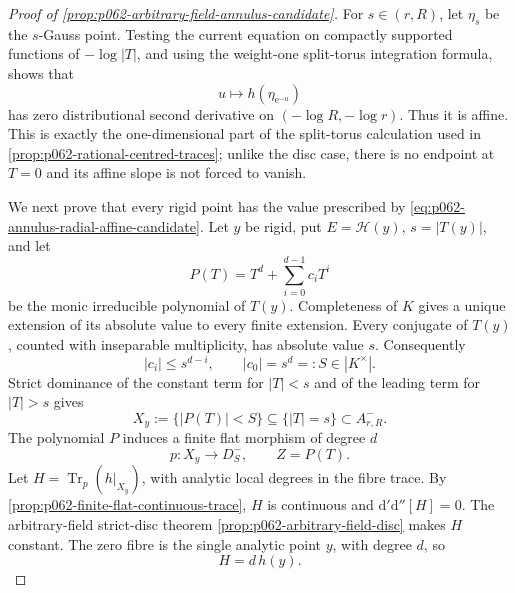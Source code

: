 \begin{proof}[Proof of \cref{prop:p062-arbitrary-field-annulus-candidate}]
For \(s\in(r,R)\), let \(\eta_s\) be the \(s\)-Gauss point. Testing the
current equation on compactly supported functions of
\(-\log|T|\), and using the weight-one split-torus integration formula,
shows that
\begin{equation}\label{eq:p062-annulus-radial-affine-candidate}
             u\longmapsto h(\eta_{\mathrm e^{-u}})
\end{equation}
has zero distributional second derivative on
\((-\log R,-\log r)\). Thus it is affine. This is exactly the
one-dimensional part of the split-torus calculation used in
\cref{prop:p062-rational-centred-traces}; unlike the disc case, there is
no endpoint at \(T=0\) and its affine slope is not forced to vanish.

We next prove that every rigid point has the value prescribed by
\eqref{eq:p062-annulus-radial-affine-candidate}. Let \(y\) be rigid, put
\(E=\mathscr H(y)\), \(s=|T(y)|\), and let
\[
                 P(T)=T^d+\sum_{i=0}^{d-1}c_iT^i
\]
be the monic irreducible polynomial of \(T(y)\). Completeness of \(K\)
gives a unique extension of its absolute value to every finite extension.
Every conjugate of \(T(y)\), counted with inseparable multiplicity, has
absolute value \(s\). Consequently
\begin{equation}\label{eq:p062-annulus-coefficient-bounds-candidate}
             |c_i|\leq s^{d-i},
             \qquad |c_0|=s^d=:S\in|K^\times|.
\end{equation}
Strict dominance of the constant term for \(|T|<s\) and of the leading
term for \(|T|>s\) gives
\begin{equation}\label{eq:p062-annulus-polynomial-tube-candidate}
 X_y:=\{|P(T)|<S\}\subseteq\{|T|=s\}\subset A^-_{r,R}.
\end{equation}
The polynomial \(P\) induces a finite flat morphism of degree \(d\)
\[
             p\colon X_y\longrightarrow D^-_S,
             \qquad Z=P(T).
\]
Let \(H=\operatorname{Tr}_p(h|_{X_y})\), with analytic local degrees in
the fibre trace. By \cref{prop:p062-finite-flat-continuous-trace}, \(H\)
is continuous and \(\mathrm d'\mathrm d''[H]=0\). The arbitrary-field
strict-disc theorem \cref{prop:p062-arbitrary-field-disc} makes \(H\)
constant. The zero fibre is the single analytic point \(y\), with degree
\(d\), so
\begin{equation}\label{eq:p062-annulus-trace-zero-candidate}
                              H=d\,h(y).
\end{equation}


\end{proof}
